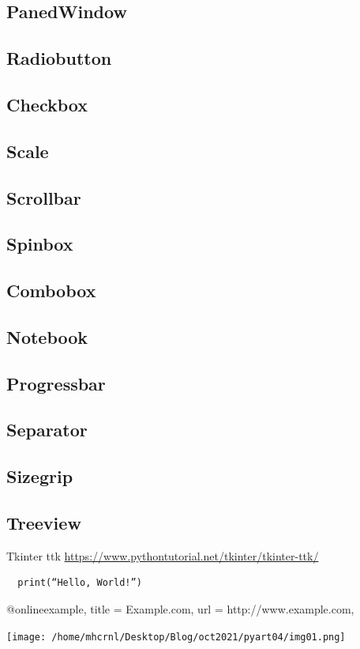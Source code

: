 \documentclass[12pt,a4paper]{book}
\begin{document}
\subsection{PanedWindow}

\subsection{Radiobutton}

\subsection{Checkbox}

\subsection{Scale}

\subsection{Scrollbar}

\subsection{Spinbox}

\subsection{Combobox}

\subsection{Notebook}

\subsection{Progressbar}

\subsection{Separator}

\subsection{Sizegrip}

\subsection{Treeview}

Tkinter ttk \url{https://www.pythontutorial.net/tkinter/tkinter-ttk/}
 
\begin{verbatim}
  print(“Hello, World!”) 
\end{verbatim} 

@online{example,
    title = {Example.com},
    url   = {http://www.example.com},
}

   

	



  \texttt{[image: /home/mhcrnl/Desktop/Blog/oct2021/pyart04/img01.png]}
  
 
\end{document}
